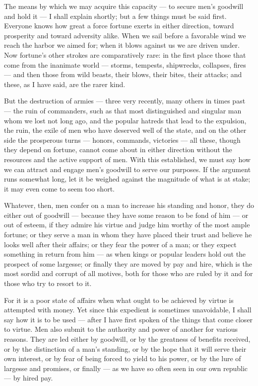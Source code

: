 The means by which we may acquire this capacity — to secure men's goodwill and hold it — I shall explain shortly; but a few things must be said first. Everyone knows how great a force fortune exerts in either direction, toward prosperity and toward adversity alike. When we sail before a favorable wind we reach the harbor we aimed for; when it blows against us we are driven under. Now fortune's other strokes are comparatively rare: in the first place those that come from the inanimate world — storms, tempests, shipwrecks, collapses, fires — and then those from wild beasts, their blows, their bites, their attacks; and these, as I have said, are the rarer kind.

 But the destruction of armies — three very recently, many others in times past — the ruin of commanders, such as that most distinguished and singular man whom we lost not long ago, and the popular hatreds that lead to the expulsion, the ruin, the exile of men who have deserved well of the state, and on the other side the prosperous turns — honors, commands, victories — all these, though they depend on fortune, cannot come about in either direction without the resources and the active support of men. With this established, we must say how we can attract and engage men's goodwill to serve our purposes. If the argument runs somewhat long, let it be weighed against the magnitude of what is at stake; it may even come to seem too short.

 Whatever, then, men confer on a man to increase his standing and honor, they do either out of goodwill — because they have some reason to be fond of him — or out of esteem, if they admire his virtue and judge him worthy of the most ample fortune; or they serve a man in whom they have placed their trust and believe he looks well after their affairs; or they fear the power of a man; or they expect something in return from him — as when kings or popular leaders hold out the prospect of some largesse; or finally they are moved by pay and hire, which is the most sordid and corrupt of all motives, both for those who are ruled by it and for those who try to resort to it.

 For it is a poor state of affairs when what ought to be achieved by virtue is attempted with money. Yet since this expedient is sometimes unavoidable, I shall say how it is to be used — after I have first spoken of the things that come closer to virtue. Men also submit to the authority and power of another for various reasons. They are led either by goodwill, or by the greatness of benefits received, or by the distinction of a man's standing, or by the hope that it will serve their own interest, or by fear of being forced to yield to his power, or by the lure of largesse and promises, or finally — as we have so often seen in our own republic — by hired pay.

